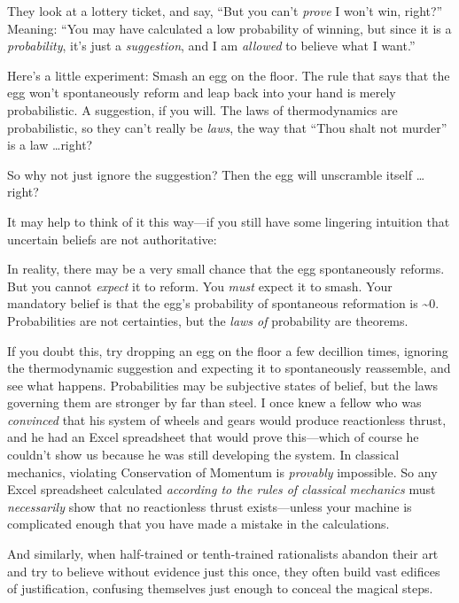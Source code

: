 {
 They look at a lottery ticket, and say, ``But you
can't \textit{prove} I won't win,
right?'' Meaning: ``You may have
calculated a low probability of winning, but since it is a
\textit{probability}, it's just a \textit{suggestion},
and I am \textit{allowed} to believe what I want.''}

{
 Here's a little experiment: Smash an egg on the
floor. The rule that says that the egg won't
spontaneously reform and leap back into your hand is merely
probabilistic. A suggestion, if you will. The laws of thermodynamics
are probabilistic, so they can't really be
\textit{laws}, the way that ``Thou shalt not
murder'' is a law \ldots right?}

{
 So why not just ignore the suggestion? Then the egg will
unscramble itself \ldots right?}

{
 It may help to think of it this way---if you still have some
lingering intuition that uncertain beliefs are not authoritative:}

{
 In reality, there may be a very small chance that the egg
spontaneously reforms. But you cannot \textit{expect} it to reform. You
\textit{must} expect it to smash. Your mandatory belief is that the
egg's probability of spontaneous reformation is \~{}0.
Probabilities are not certainties, but the \textit{laws of} probability
are theorems.}

{
 If you doubt this, try dropping an egg on the floor a few
decillion times, ignoring the thermodynamic suggestion and expecting it
to spontaneously reassemble, and see what happens. Probabilities may be
subjective states of belief, but the laws governing them are stronger
by far than steel. I once knew a fellow who was \textit{convinced} that
his system of wheels and gears would produce reactionless thrust, and
he had an Excel spreadsheet that would prove this---which of course he
couldn't show us because he was still developing the
system. In classical mechanics, violating Conservation of Momentum is
\textit{provably} impossible. So any Excel spreadsheet calculated
\textit{according to the rules of classical mechanics} must
\textit{necessarily} show that no reactionless thrust exists---unless
your machine is complicated enough that you have made a mistake in the
calculations.}

{
 And similarly, when half-trained or tenth-trained rationalists
abandon their art and try to believe without evidence just this once,
they often build vast edifices of justification, confusing themselves
just enough to conceal the magical steps.}


